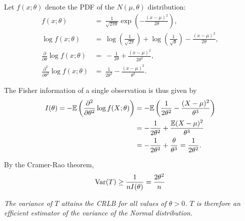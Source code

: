 \begin{exercise}
\begin{questions}
\begin{answer}
Let $f(x;\theta)$ denote the PDF of the $N(\mu,\theta)$ distribution:
\begin{align*}
f(x;\theta) 
	& = \ \frac{1}{\sqrt{2\pi\theta}}\exp\left(-\frac{(x-\mu)^2}{2\theta}\right), \\[2ex]
\log f(x;\theta)
	& = \ \log\left(\frac{1}{\sqrt{2\pi}}\right) + \log\left(\frac{1}{\sqrt{\theta}}\right)  - \frac{(x-\mu)^2}{2\theta}, \\[2ex]
\frac{\partial}{\partial\theta}\log f(x;\theta)
	& = \ -\frac{1}{2\theta} + \frac{(x-\mu)^2}{2\theta^2}, \\[2ex]
\frac{\partial^2}{\partial\theta^2}\log f(x;\theta)
	& = \ \frac{1}{2\theta^2} - \frac{(x-\mu)^2}{\theta^3}.
\end{align*}

The Fisher information of a single observation is thus given by
\begin{align*}
I(\theta) 
	= -\mathbb{E}\left(\frac{\partial^2}{\partial\theta^2}\log f(X;\theta)\right)
	& = -\mathbb{E}\left(\frac{1}{2\theta^2} - \frac{(X-\mu)^2}{\theta^3}\right) \\
	& = -\frac{1}{2\theta^2} + \frac{\mathbb{E}(X-\mu)^2}{\theta^3} \\
	& = -\frac{1}{2\theta^2} + \frac{\theta}{\theta^3} 
	= \frac{1}{2\theta^2}.
\end{align*}

By the Cramer-Rao theorem,
\[
\text{Var}(T) \geq \frac{1}{nI(\theta)} = \frac{2\theta^2}{n}
\]

\bit
\it The variance of $T$ attains the CRLB for all values of $\theta>0$.
\it $T$ is therefore an efficient estimator of the variance of the Normal distribution.
\eit
\end{answer}


\end{questions}
\end{exercise}

